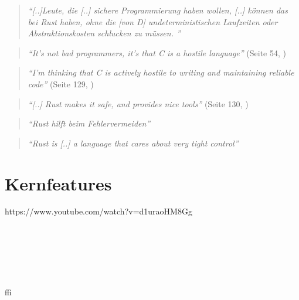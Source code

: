 \begin{quotation}
	\textit{\enquote{[..]Leute, die [..] sichere Programmierung haben wollen, [..] können das bei Rust haben, ohne die [von D] undeterministischen Laufzeiten oder Abstraktionskosten schlucken zu müssen. }}
	\cite{rust:fefe}
\end{quotation}




\begin{quotation}
	\textit{\enquote{It’s not bad programmers, it’s that C is a hostile language}} 
	(Seite 54, \cite{rust:c_is_hostile_mena})
\end{quotation}

\begin{quotation}
	\textit{\enquote{I’m thinking that C is actively hostile to writing and maintaining reliable code}} 
	(Seite 129, \cite{rust:c_is_hostile_mena})
\end{quotation}

\begin{quotation}
	\textit{\enquote{[..] Rust makes it safe, and  provides nice tools}} 
	(Seite 130, \cite{rust:c_is_hostile_mena})
\end{quotation}


\begin{quotation}
	\textit{\enquote{Rust hilft beim Fehlervermeiden}} 
	\cite{rust:c_is_hostile_golem}
\end{quotation}


\begin{quotation}
	\textit{\enquote{Rust is [..] a language that cares about very tight control}}
	\cite{rust:tight_control}
\end{quotation}

 \cite{rust:orly_y_rust}

\section{Kernfeatures}

https://www.youtube.com/watch?v=d1uraoHM8Gg \\
 \\
 \\
 \\
 \\
 \\
 \\
 \gls{ffi} \\
 \\
 \\

